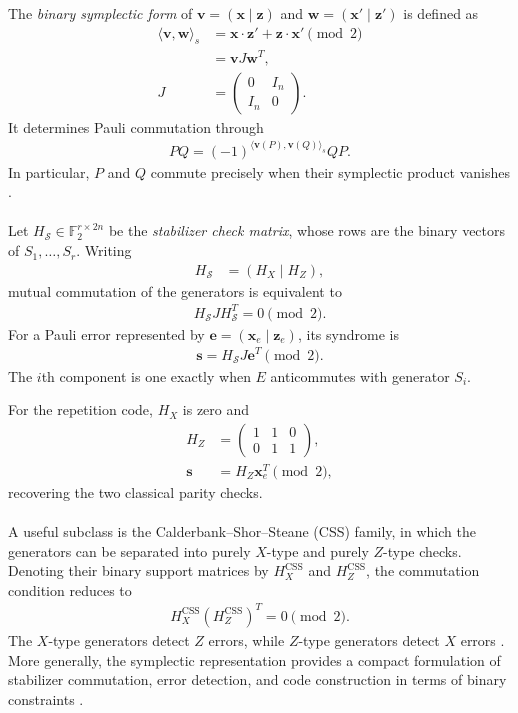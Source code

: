 \documentclass[amssymb,twocolumn,aps]{revtex4-2}
\begin{document}
The \textit{binary symplectic form} of $\mathbf v=(\mathbf x\mid\mathbf z)$ and $\mathbf w=(\mathbf x'\mid\mathbf z')$ is defined as
\begin{align*}
    \langle\mathbf v,\mathbf w\rangle_s
    &=\mathbf x\cdot\mathbf z'
      +\mathbf z\cdot\mathbf x'\pmod2\\
    &=\mathbf v J\mathbf w^T,\\
    J&=\begin{pmatrix}
        0&I_n\\ I_n&0
    \end{pmatrix}.
\end{align*}
It determines Pauli commutation through
\begin{align*}
    PQ=(-1)^{\langle\mathbf v(P),
                     \mathbf v(Q)\rangle_s}QP.
\end{align*}
In particular, $P$ and $Q$ commute precisely when their symplectic product vanishes \cite{gottesman2024surviving,calderbank1998quantum}.
\\\\
Let $H_{\mathcal S}\in\mathbb F_2^{r\times2n}$ be the \textit{stabilizer check matrix}, whose rows are the binary vectors of $S_1,\ldots,S_r$. Writing
\begin{align*}
    H_{\mathcal S}&=(H_X\mid H_Z),
\end{align*}
mutual commutation of the generators is equivalent to
\begin{align*}
    H_{\mathcal S}JH_{\mathcal S}^T=0\pmod2.
\end{align*}
For a Pauli error represented by $\mathbf e=(\mathbf x_e\mid\mathbf z_e)$, its syndrome is
\begin{align*}
    \mathbf s=H_{\mathcal S}J\mathbf e^T\pmod2.
\end{align*}
The $i$th component is one exactly when $E$ anticommutes with generator $S_i$.

For the repetition code, $H_X$ is zero and
\begin{align*}
    H_Z&=\begin{pmatrix}
       1&1&0\\
       0&1&1
    \end{pmatrix},\\
    \mathbf s&=H_Z\mathbf x_e^T\pmod2,
\end{align*}
recovering the two classical parity checks.
\\\\
A useful subclass is the Calderbank--Shor--Steane (CSS) family, in which the generators can be separated into purely $X$-type and purely $Z$-type checks. Denoting their binary support matrices by $H_X^{\mathrm{CSS}}$ and $H_Z^{\mathrm{CSS}}$, the commutation condition reduces to
\begin{align*}
    H_X^{\mathrm{CSS}}
    (H_Z^{\mathrm{CSS}})^T=0\pmod2.
\end{align*}
The $X$-type generators detect $Z$ errors, while $Z$-type generators detect $X$ errors \cite{calderbank1998quantum}. More generally, the symplectic representation provides a compact formulation of stabilizer commutation, error detection, and code construction in terms of binary constraints \cite{calderbank1998quantum}.
\end{document}
